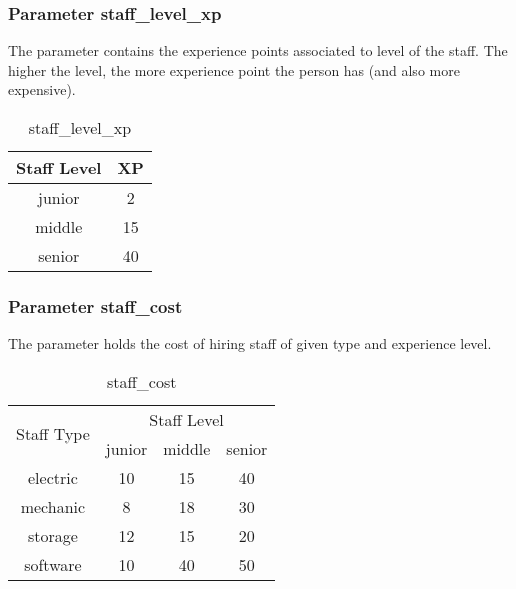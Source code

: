         \subsubsection{Parameter staff\_level\_xp}
        The parameter contains the experience points associated to level of the staff. The higher the 
        level, the more experience point the person has (and also more expensive).
        \begin{table}[H]
            \begin{center}
                \begin{tabular}{ |c|c| } 
                \hline
                Staff Level & XP \\
                \hline
                junior   & 2  \\ 
                middle   & 15 \\ 
                senior   & 40 \\
                \hline
                \end{tabular}
            \end{center}
        \caption{staff\_level\_xp} %
        \label{param_staff_level_xp} %
        \end{table}

        \subsubsection{Parameter staff\_cost}
        The parameter holds the cost of hiring staff of given type and experience level.
        \begin{table}[H]
            \begin{center}
                \begin{tabular}{ |c|c|c|c| } 
                \hline
                \multirow{2}{*}{Staff Type} &
                \multicolumn{3}{|c|}{Staff Level}\\
                \cline{2-4}
                & junior & middle & senior \\ 
                \hline
                electric   & 10 & 15 & 40 \\ 
                mechanic   & 8  & 18 & 30 \\ 
                storage    & 12 & 15 & 20 \\ 
                software   & 10 & 40 & 50 \\
                \hline
                \end{tabular}
            \end{center}
        \caption{staff\_cost} %
        \label{param_staff_cost} %
        \end{table}

